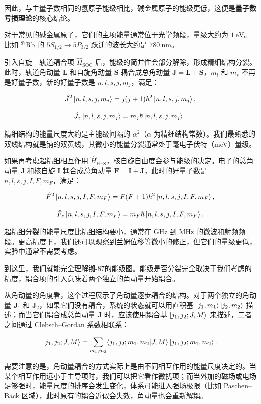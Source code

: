 因此，与主量子数相同的氢原子能级相比，碱金属原子的能级更低，这便是\textbf{量子数亏损理论}的核心结论。

对于常见的碱金属原子，它们的主项能量通常位于光学频段，量级大约为 $1\ \mathrm{eV}$。比如 $^{87}\mathrm{Rb}$ 的 $5S_{1/2}\rightarrow5P_{3/2}$ 跃迁的波长大约是 $780\ \mathrm{nm}$。

引入自旋—轨道耦合项 $\hat{H}_\text{SOC}$ 后，能级的简并性会部分解除，形成精细结构分裂。此时，轨道角动量 $\boldsymbol{L}$ 和自旋角动量 $\boldsymbol{S}$ 耦合成总角动量 $\boldsymbol{J}=\boldsymbol{L}+\boldsymbol{S}$，$m_l$ 和 $m_s$ 不再是好量子数，新的好量子数是 $n,l,s,j,m_j$，满足：

\[
\hat{J}^2 \ket{n,l,s,j,m_j} = j(j+1)\hbar^2 \ket{n,l,s,j,m_j},
\]

\[
\hat{J}_z \ket{n,l,s,j,m_j} = m_j \hbar \ket{n,l,s,j,m_j}.
\]

精细结构的能量尺度大约是主能级间隔的 $\alpha^2$（$\alpha$ 为精细结构常数）。我们最熟悉的双线结构就是钠的双黄线，其微小的能量分裂通常处于毫电子伏特（meV）量级。

如果再考虑超精细相互作用 $\hat{H}_\text{HFS}$，核自旋自由度会参与能级的决定。电子的总角动量 $\boldsymbol{J}$ 和核自旋 $\boldsymbol{I}$ 耦合成总角动量 $\boldsymbol{F}=\boldsymbol{I}+\boldsymbol{J}$，此时的好量子数是 $n,l,s,j,I,F,m_F$，满足：

\[
\hat{F}^2 \ket{n,l,s,j,I,F,m_F} = F(F+1)\hbar^2 \ket{n,l,s,j,I,F,m_F},
\]

\[
\hat{F}_z \ket{n,l,s,j,I,F,m_F} = m_F \hbar \ket{n,l,s,j,I,F,m_F}.
\]

超精细分裂的能量尺度比精细结构要小，通常在 GHz 到 MHz 的微波和射频频段。更高精度下，我们还可以观察到兰姆位移等微小的修正，但它们的量级更低，实验中通常不需要考虑。

到这里，我们就能完全理解铷-87的能级图。能级是否分裂完全取决于我们考虑的精度，耦合项的引入意味着两个独立的角动量开始耦合。

从角动量的角度看，这个过程展示了角动量逐步耦合的结构。对于两个独立的角动量 $\boldsymbol{J}_1$ 和 $\boldsymbol{J}_2$，如果它们没有耦合，系统的状态就可以用直积基 $\ket{j_1,m_1}\ket{j_2,m_2}$ 描述；而当它们耦合成总角动量 $\boldsymbol{J}$ 时，应该使用耦合基 $\ket{j_1,j_2;J,M}$ 来描述，二者之间通过 Clebsch–Gordan 系数相联系：

\[
\ket{j_1,j_2;J,M} = \sum_{m_1,m_2} \langle j_1,j_2;m_1,m_2 \vert J,M \rangle \ket{j_1,j_2;m_1,m_2}.
\]

需要注意的是，角动量耦合的方式实际上是由不同相互作用的能量尺度决定的。当某个相互作用远小于主导项时，我们可以把它看作微扰项；而当外加的磁场或电场足够强时，能量尺度的排序会发生变化，体系可能进入强场极限（比如 Paschen–Back 区域），此时原有的耦合近似会失效，角动量也会重新解耦。

